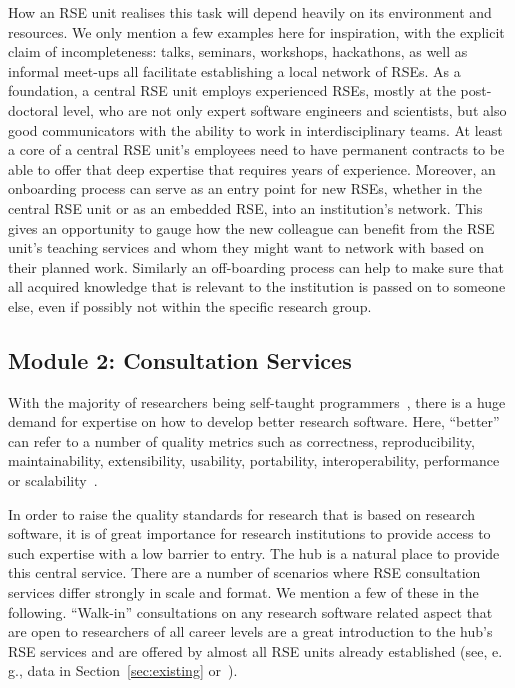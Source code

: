 \documentclass[a4paper]{article}
\newcommand*{\eg}{e.\,g.,\xspace}
\begin{document}
How an RSE unit realises this task will depend heavily on its environment and resources.
We only mention a few examples here for inspiration, with the explicit claim of incompleteness:
talks, seminars, workshops, hackathons, as well as informal meet-ups all facilitate establishing a local network of RSEs.
As a foundation, a central RSE unit employs experienced RSEs, mostly at the post-doctoral level, who are not only expert software engineers and scientists, but also good communicators with the ability to work in interdisciplinary teams.
At least a core of a central RSE unit's employees need to have permanent contracts to be able to offer that deep expertise that requires years of experience.
Moreover, an onboarding process can serve as an entry point for new RSEs, whether in the central RSE unit or as an embedded RSE, into an institution's network.
This gives an opportunity to gauge how the new colleague can benefit from the RSE unit's teaching services and whom they might want to network with based on their planned work.
Similarly an off-boarding process can help to make sure that all acquired knowledge that is relevant to the institution is passed on to someone else, even if possibly not within the specific research group.

\subsection{Module 2: Consultation Services}%
\label{sec:consultation}

With the majority of researchers being self-taught programmers~\autocite{Carver2013}, there is a huge demand for expertise on how to develop better research software.
Here, “better” can refer to a number of quality metrics such as correctness, reproducibility, maintainability, extensibility, usability, portability, interoperability, performance or scalability~\autocite[Chapter 16]{Schulmeyer2008}.

In order to raise the quality standards for research that is based on research software, it is of great importance for research institutions to provide access to such expertise with a low barrier to entry.
The hub is a natural place to provide this central service.
There are a number of scenarios where RSE consultation services differ strongly in scale and format.
We mention a few of these in the following.
“Walk-in” consultations on any research software related aspect that are open to researchers of all career levels are a great introduction to the hub's RSE services and are offered by almost all RSE units already established (see, \eg{} data in Section~\ref{sec:existing} or~\cite{Katz2019}).
\end{document}
